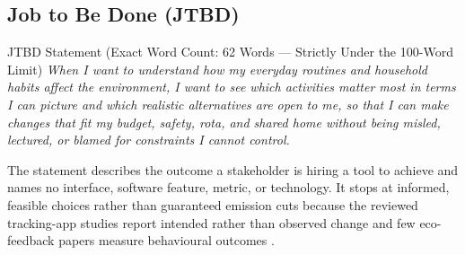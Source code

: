 \documentclass[12pt, a4paper]{article}
\begin{document}
\subsection{Job to Be Done (JTBD)}

\begin{jtbdbox}{JTBD Statement (Exact Word Count: 62 Words --- Strictly Under the 100-Word Limit)}
\textit{When I want to understand how my everyday routines and household habits affect the environment, I want to see which activities matter most in terms I can picture and which realistic alternatives are open to me, so that I can make changes that fit my budget, safety, rota, and shared home without being misled, lectured, or blamed for constraints I cannot control.}
\end{jtbdbox}

The statement describes the outcome a stakeholder is hiring a tool to achieve and names no interface, software feature, metric, or technology. It stops at informed, feasible choices rather than guaranteed emission cuts because the reviewed tracking-app studies report intended rather than observed change \cite{hoffmann2024,lasarov2024} and few eco-feedback papers measure behavioural outcomes \cite{froehlich2010}.
\end{document}
